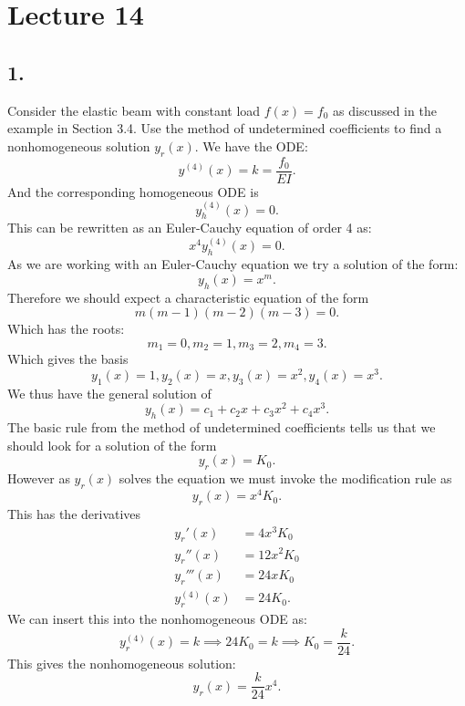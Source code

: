 \section*{Lecture 14}

\subsection*{1.} Consider the elastic beam with constant load $f(x) = f_0$ as discussed in the example in Section 3.4. Use the method of undetermined coefficients to find a nonhomogeneous solution $y_r(x)$.
\bigbreak
We have the ODE:
\[ 
y^{(4)} (x) = k = \frac{f_0}{EI}
.\]
And the corresponding homogeneous ODE is
\[ 
y_h^{(4)}(x) = 0
.\]
This can be rewritten as an Euler-Cauchy equation of order 4 as:
\[ 
x^{4} y_h^{(4)} (x) = 0
.\]
As we are working with an Euler-Cauchy equation we try a solution of the form:
\[ 
y_h(x) = x^{m}
.\]
Therefore we should expect a characteristic equation of the form
\[ 
m(m-1)(m-2)(m-3) = 0
.\]
Which has the roots:
\[ 
m_1 = 0, m_2 = 1, m_3 = 2, m_4 = 3
.\]
Which gives the basis
\[ 
y_1(x) = 1, y_2(x) = x, y_3(x) = x^2, y_4(x) = x^3
.\]
We thus have the general solution of
\[ 
y_h(x) = c_1 + c_2 x + c_3 x^2 + c_4 x^3
.\]
The basic rule from the method of undetermined coefficients tells us that we should look for a solution of the form
\[ 
y_r(x) = K_0
.\]
However as $y_r(x)$ solves the equation we must invoke the modification rule as
\[ 
y_r(x) = x^{4} K_0
.\]
This has the derivatives
\begin{align*}
  y_r'(x) &= 4x^3 K_0 \\
  y_r''(x) &= 12 x^2 K_0 \\
  y_r'''(x) &= 24 x K_0 \\
  y_r^{(4)}(x) &= 24 K_0
.\end{align*}
We can insert this into the nonhomogeneous ODE as:
\[ 
y_r^{(4)}(x) = k \implies 24 K_0 = k \implies K_0 = \frac{k}{24}
.\]
This gives the nonhomogeneous solution:
\[ 
y_r(x) = \frac{k}{24} x^{4}
.\]

